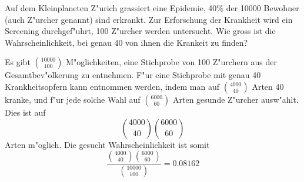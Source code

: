 Auf dem Kleinplaneten Z"urich grassiert eine Epidemie, 40\% der 10000 Bewohner
(auch Z"urcher genannt) sind
erkrankt. Zur Erforschung der Krankheit wird ein Screening durchgef"uhrt,
100 Z"urcher werden untersucht. Wie gross ist die Wahrscheinlichkeit,
bei genau 40 von ihnen die Krankeit zu finden?

\begin{loesung}
Es gibt $\binom{10000}{100}$ M"oglichkeiten, eine Stichprobe von
100 Z"urchern aus der Gesamtbev"olkerung zu entnehmen. F"ur eine
Stichprobe mit genau 40 Krankheitsopfern kann entnommen
werden, indem man auf
$\binom{4000}{40}$ Arten 40 kranke, und f"ur jede solche Wahl
auf $\binom{6000}{60}$ Arten
gesunde Z"urcher ausw"ahlt. Dies ist auf
\[
\binom{4000}{40}\binom{6000}{60}
\]
Arten m"oglich.
Die gesucht Wahrscheinlichkeit ist somit
\[
\frac{\binom{4000}{40}\binom{6000}{60}}{\binom{10000}{100}}=
0.08162
\]
\end{loesung}

